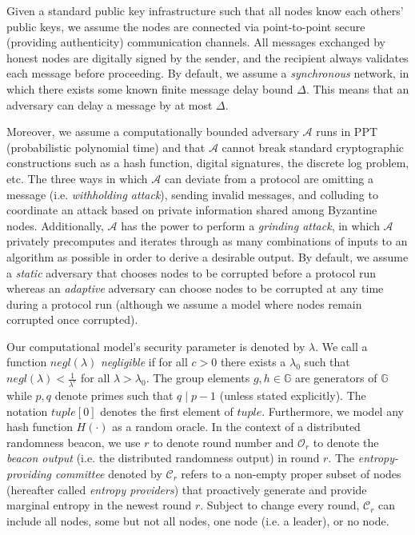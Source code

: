 \documentclass[letterpaper,twocolumn,10pt]{article}
\theoremstyle{definition}
\theoremstyle{remark}
\begin{document}
Given a standard public key infrastructure such that all nodes know each others' public keys, we assume the nodes are connected via point-to-point secure (providing authenticity) communication channels. All messages exchanged by honest nodes are digitally signed by the sender, and the recipient always validates each message before proceeding. By default, we assume a \textit{synchronous} network, in which there exists some known finite message delay bound $\Delta$. This means that an adversary can delay a message by at most $\Delta$.

Moreover, we assume a computationally bounded adversary $\mathcal{A}$ runs in PPT (probabilistic polynomial time) and that $\mathcal{A}$ cannot break standard cryptographic constructions such as a hash function, digital signatures, the discrete log problem, etc. The three ways in which $\mathcal{A}$ can deviate from a protocol are omitting a message (i.e. \textit{withholding attack}), sending invalid messages, and colluding to coordinate an attack based on private information shared among Byzantine nodes. Additionally, $\mathcal{A}$ has the power to perform a \textit{grinding attack}, in which $\mathcal{A}$ privately precomputes and iterates through as many combinations of inputs to an algorithm as possible in order to derive a desirable output. By default, we assume a \textit{static} adversary that chooses nodes to be corrupted before a protocol run whereas an \textit{adaptive} adversary can choose nodes to be corrupted at any time during a protocol run (although we assume a model where nodes remain corrupted once corrupted).

Our computational model's security parameter is denoted by $\lambda$. We call a function $negl(\lambda)$ \textit{negligible} if for all $c > 0$ there exists a $\lambda_0$ such that $negl(\lambda) < \frac{1}{\lambda^c}$ for all $\lambda > \lambda_0$. The group elements $g, h \in \mathbb{G}$ are generators of $\mathbb{G}$ while $p, q$ denote primes such that $q \mid p - 1$ (unless stated explicitly). The notation $tuple[0]$ denotes the first element of $tuple$. Furthermore, we model any hash function $H(\cdot)$ as a random oracle. In the context of a distributed randomness beacon, we use $r$ to denote round number and $\mathcal{O}_r$ to denote the \textit{beacon output} (i.e. the distributed randomness output) in round $r$. The \textit{entropy-providing committee} denoted by $\mathcal{C}_r$ refers to a non-empty proper subset of nodes (hereafter called \textit{entropy providers}) that proactively generate and provide marginal entropy in the newest round $r$. Subject to change every round, $\mathcal{C}_r$ can include all nodes, some but not all nodes, one node (i.e. a leader), or no node.
\end{document}

